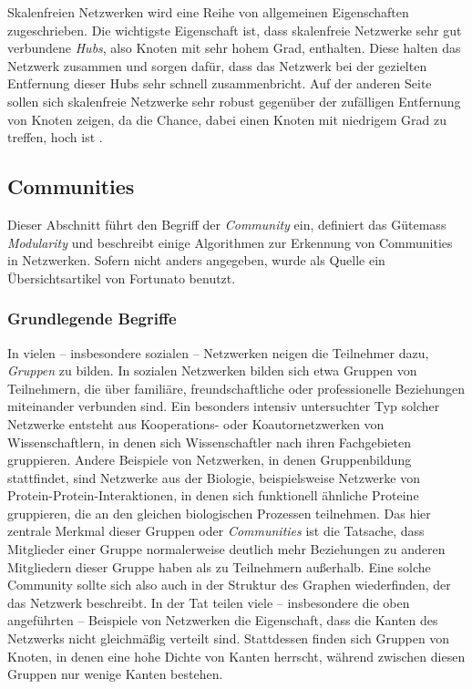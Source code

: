 Skalenfreien Netzwerken wird eine Reihe von allgemeinen Eigenschaften
zugeschrieben. Die wichtigste Eigenschaft ist, dass skalenfreie
Netzwerke sehr gut verbundene \emph{Hubs}, also Knoten mit sehr hohem
Grad, enthalten. Diese halten das Netzwerk zusammen und sorgen
dafür, dass das Netzwerk bei der gezielten Entfernung dieser Hubs
sehr schnell zusammenbricht. Auf der anderen Seite sollen sich
skalenfreie Netzwerke sehr robust gegenüber der zufälligen
Entfernung von Knoten zeigen, da die Chance, dabei einen Knoten mit
niedrigem Grad zu treffen, hoch ist \cite{Albert2000}.

\subsection{Communities}
\label{ch:Grundlagen:sec:Netzwerkanalyse:subsec:Communities}

Dieser Abschnitt führt den Begriff der \emph{Community} ein,
definiert das Gütemass \emph{Modularity} und beschreibt einige
Algorithmen zur Erkennung von Communities in Netzwerken. Sofern nicht
anders angegeben, wurde als Quelle ein Übersichtsartikel von
Fortunato \cite{Fortunato2010} benutzt.

\subsubsection{Grundlegende Begriffe}
\label{sec:grundl-begr}

In vielen -- insbesondere sozialen -- Netzwerken neigen die Teilnehmer
dazu, \emph{Gruppen} zu bilden. In sozialen Netzwerken bilden sich
etwa Gruppen von Teilnehmern, die über familiäre,
freundschaftliche oder professionelle Beziehungen miteinander
verbunden sind. Ein besonders intensiv untersuchter Typ solcher
Netzwerke entsteht aus Kooperations- oder Koautornetzwerken von
Wissenschaftlern, in denen sich Wissenschaftler nach ihren
Fachgebieten gruppieren. Andere Beispiele von Netzwerken, in denen
Gruppenbildung stattfindet, sind Netzwerke aus der Biologie,
beispielsweise Netzwerke von Protein-Protein-Interaktionen, in denen
sich funktionell ähnliche Proteine gruppieren, die an den gleichen
biologischen Prozessen teilnehmen. Das hier zentrale Merkmal dieser
Gruppen oder \emph{Communities} ist die Tatsache, dass Mitglieder
einer Gruppe normalerweise deutlich mehr Beziehungen zu anderen
Mitgliedern dieser Gruppe haben als zu Teilnehmern außerhalb. Eine
solche Community sollte sich also auch in der Struktur des Graphen
wiederfinden, der das Netzwerk beschreibt. In der Tat teilen viele --
insbesondere die oben angeführten -- Beispiele von Netzwerken die
Eigenschaft, dass die Kanten des Netzwerks nicht gleichmäßig
verteilt sind. Stattdessen finden sich Gruppen von Knoten, in denen
eine hohe Dichte von Kanten herrscht, während zwischen diesen
Gruppen nur wenige Kanten bestehen.

